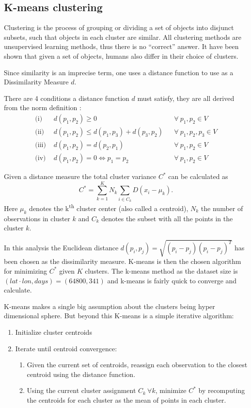 \subsection{K-means clustering}

Clustering is the process of grouping or dividing a set of objects into disjunct subsets, such that objects in each cluster are similar.
All clustering methods are unsupervised learning methods, thus there is no ``correct'' answer.
It have been shown that given a set of objects, humans also differ in their choice of clusters.

Since similarity is an imprecise term, one uses a distance function to use as a Dissimilarity Measure $d$.

There are 4 conditions a distance function $d$ must satisfy, they are all derived from the norm definition \cite[p.~30]{math-4}:
\begin{align}
\text{(i) }   & d(p_1,p_2) \ge 0 && \forall \ p_1, p_2 \in V \\
\text{(ii) }  & d(p_1,p_2) \le d(p_1, p_3) + d(p_3, p_2) && \forall \ p_1, p_2, p_3 \in V \\
\text{(iii) } & d(p_1, p_2) = d(p_2, p_1) && \forall \ p_1, p_2 \in V \\
\text{(iv) } & d(p_1, p_2) = 0 \Leftrightarrow p_1 = p_2 && \forall \ p_1, p_2 \in V
\end{align}

Given a distance measure the total cluster variance $C^{*}$ can be calculated as
\begin{equation}
C^{*}=\sum^K_{k=1} N_k \sum_{i \in C_k} D(x_i-\mu_k).
\end{equation}
Here $\mu_k$ denotes the k\textsuperscript{th} cluster center (also called a centroid), $N_k$ the number of observations in cluster $k$ and $C_k$ denotes the subset with all the points in the cluster $k$.

In this analysis the Euclidean distance $d(p_i, p_j)= \sqrt{(p_i-p_j)(p_i-p_j)^{T}}$ has been chosen as the dissimilarity measure.
K-means is then the chosen algorithm for minimizing $C^{*}$ given $K$ clusters.
The k-means method as the dataset size is $(lat \cdot lon, days) = (64800,341)$ and k-means is fairly quick to converge and calculate.

K-means makes a single big assumption about the clusters being hyper dimensional sphere. But beyond this K-means is a simple iterative algorithm:
\begin{enumerate}
	\item Initialize cluster centroids
	\item Iterate until centroid convergence:
	\begin{enumerate}
		\item Given the current set of centroids, reassign each observation to the closest centroid using the distance function.
		\item Using the current cluster assignment $C_k\ \forall k$, minimize $C^{*}$ by recomputing the centroids for each cluster as the mean of points in each cluster.
	\end{enumerate}
\end{enumerate}

